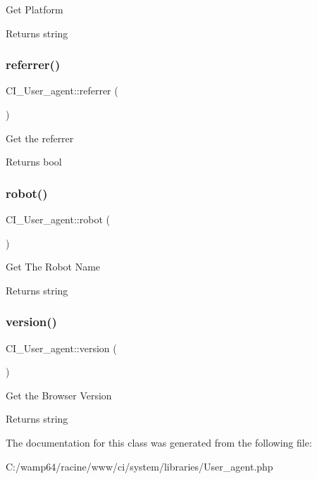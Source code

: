 Get Platform

\begin{DoxyReturn}{Returns}
string 
\end{DoxyReturn}
\mbox{\label{class_c_i___user__agent_a234ef733fad2effab4da28114d3142d8}} 
\subsubsection{\texorpdfstring{referrer()}{referrer()}}
{\footnotesize\ttfamily C\+I\+\_\+\+User\+\_\+agent\+::referrer (\begin{DoxyParamCaption}{ }\end{DoxyParamCaption})}

Get the referrer

\begin{DoxyReturn}{Returns}
bool 
\end{DoxyReturn}
\mbox{\label{class_c_i___user__agent_a79f8212e8fe40e7e902f7fc0e0b03d7d}} 
\subsubsection{\texorpdfstring{robot()}{robot()}}
{\footnotesize\ttfamily C\+I\+\_\+\+User\+\_\+agent\+::robot (\begin{DoxyParamCaption}{ }\end{DoxyParamCaption})}

Get The Robot Name

\begin{DoxyReturn}{Returns}
string 
\end{DoxyReturn}
\mbox{\label{class_c_i___user__agent_a1a948b9d835ccac64ce166e735b49b38}} 
\subsubsection{\texorpdfstring{version()}{version()}}
{\footnotesize\ttfamily C\+I\+\_\+\+User\+\_\+agent\+::version (\begin{DoxyParamCaption}{ }\end{DoxyParamCaption})}

Get the Browser Version

\begin{DoxyReturn}{Returns}
string 
\end{DoxyReturn}


The documentation for this class was generated from the following file\+:\begin{DoxyCompactItemize}
\item 
C\+:/wamp64/racine/www/ci/system/libraries/User\+\_\+agent.\+php\end{DoxyCompactItemize}
